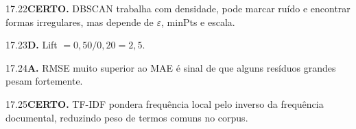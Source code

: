 \begin{solucao}{17.22}\textbf{CERTO.} DBSCAN trabalha com densidade, pode marcar ruído e encontrar formas irregulares, mas depende de $\varepsilon$, minPts e escala.\end{solucao}
\begin{solucao}{17.23}\textbf{D.} Lift $=0,50/0,20=2,5$.\end{solucao}
\begin{solucao}{17.24}\textbf{A.} RMSE muito superior ao MAE é sinal de que alguns resíduos grandes pesam fortemente.\end{solucao}
\begin{solucao}{17.25}\textbf{CERTO.} TF-IDF pondera frequência local pelo inverso da frequência documental, reduzindo peso de termos comuns no corpus.\end{solucao}

